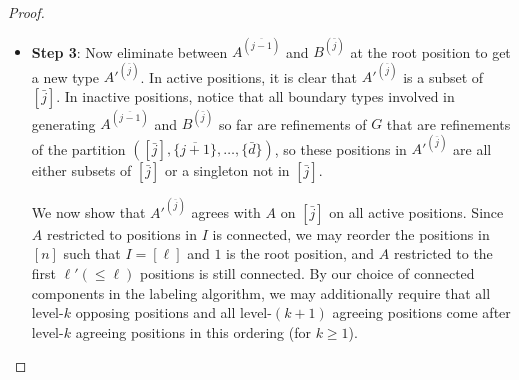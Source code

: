 \documentclass[letterpaper,reqno,11pt]{amsart}
\begin{document}
\begin{proof}
\begin{itemize}
        In particular, this type can be generated the set of boundary types given by a permutation starting with $\bar{j}$, followed by a permutation of $\bar{J}_1$, then a permutation of $\bar{J}_2$, \dots, a permutation of $\bar{J}_{\infty}$, and finally the elements of $[\bar{d}]\setminus [\bar{j}]$ in order. By our labeling algorithm, a level-$k$ position of such a boundary type consists of a single element from $\bar{J}_k$, and $A$ restricted to the level-$k$ agreeing positions and elements of $\bar{J}_k$ is a connected type in a smaller GTOM $\mathcal{O}_k$. The graphs corresponds to the $\mathcal{O}_k$ are not connected to each other, so we can generate $B^{(\bar{j})}$ by eliminating between the boundary types of $\mathcal{O}_k$ separately and then combining the results. (If generating each smaller connected type involves $b_k$ boundary types in $\mathcal{O}_k$, then generating $B^{(\bar{j})}$ involves $\prod_{k} b_k$ boundary types in $\mathcal{O}$.)

        {\color{gray} [In the example, the lexicographically smallest boundary type used to generate $B^{(\bar{9})}$ is \[(\bar{9}, \bar{9}, \bar{1}, \bar{1}, \bar{3}, \bar{2}, \bar{6}, \bar{2}, \bar{9}),\] by refining $G$ with permutation $(\bar{9}\ |\ \bar{1}, \bar{5}\ |\ \bar{2}, \bar{3}, \bar{4}\ |\ \bar{6}, \bar{7}\ |\ \bar{8})$. The three smaller GTOMs involve indices $\{3, \bar{1}, \bar{5}\}$, $\{5, 6, \bar{2}, \bar{3}, \bar{4}\}$, and $\{7, \bar{6}, \bar{7}\}$ respectively. Position $4$ is not fully fixed, but must be a subset of $\{\bar{1}, \bar{5}\}$ since only these two elements appear in that position among all relevant boundary types.]}

        \item \textbf{Step 3}: Now eliminate between $A^{(\overline{j-1})}$ and $B^{(\bar{j})}$ at the root position to get a new type $A'^{(\overline{j})}$. In active positions, it is clear that $A'^{(\overline{j})}$ is a subset of $[\bar{j}]$. In inactive positions, notice that all boundary types involved in generating $A^{(\overline{j-1})}$ and $B^{(\bar{j})}$ so far are refinements of $G$ that are refinements of the partition $([\bar{j}], \{\overline{j+1}\}, \dots, \{\bar{d}\})$, so these positions in $A'^{(\overline{j})}$ are all either subsets of $[\bar{j}]$ or a singleton not in $[\bar{j}]$.
        
        We now show that $A'^{(\overline{j})}$ agrees with $A$ on $[\bar{j}]$ on all active positions. Since $A$ restricted to positions in $I$ is connected, we may reorder the positions in $[n]$ such that $I = [\ell]$ and $1$ is the root position, and $A$ restricted to the first $\ell'(\leq \ell)$ positions is still connected. By our choice of connected components in the labeling algorithm, we may additionally require that all level-$k$ opposing positions and all level-$(k+1)$ agreeing positions come after level-$k$ agreeing positions in this ordering (for $k\geq 1$).


\end{itemize}
\end{proof}
\end{document}
